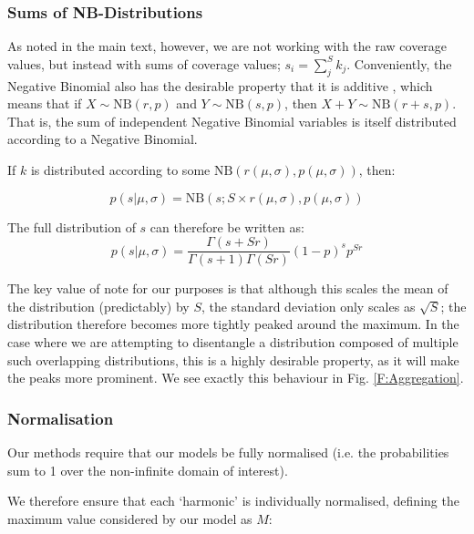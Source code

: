 \documentclass[fleqn,usenatbib]{mnras}
\begin{document}
{{					

				\subsubsection{Sums of NB-Distributions}\label{A:Sums}
					As noted in the main text, however, we are not working with the raw coverage values, but instead with sums of coverage values; $s_i = \sum_j^S k_j$. Conveniently, the Negative Binomial also has the desirable property that it is additive \citep{RHBMaths}, which means that if $X \sim \text{NB}(r,p)$ and $Y \sim \text{NB}(s,p)$, then $X + Y \sim \text{NB}(r + s,p)$. That is, the sum of independent Negative Binomial variables is itself distributed according to a Negative Binomial. 

					If $k$ is distributed according to some $\text{NB}(r(\mu,\sigma), p(\mu,\sigma))$, then:
					
					\begin{equation}
						p(s | \mu, \sigma) = 	\text{NB}\left(s; S \times r(\mu,\sigma), p(\mu,\sigma)\right)
					\end{equation}

					The full distribution of $s$ can therefore be written as:
					\begin{equation}
						p(s| \mu,\sigma) = \frac{\Gamma(s + Sr)}{\Gamma(s+1) \Gamma(Sr)} (1 - p)^s p^{Sr}
					\end{equation}

					The key value of note for our purposes is that although this scales the mean of the distribution (predictably) by $S$, the standard deviation only scales as $\sqrt{S}$; the distribution therefore becomes more tightly peaked around the maximum. In the case where we are attempting to disentangle a distribution composed of multiple such overlapping distributions, this is a highly desirable property, as it will make the peaks more prominent. We see exactly this behaviour in Fig. \ref{F:Aggregation}.

					\subsubsection{Normalisation}

						Our methods require that our models be fully normalised (i.e. the probabilities sum to 1 over the non-infinite domain of interest). 
						
						We therefore ensure that each `harmonic' is individually normalised, defining the maximum value considered by our model as $M$:

}}
\end{document}
